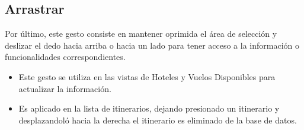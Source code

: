 \subsection{Arrastrar}
Por último, este gesto consiste en mantener oprimida el área de selección y deslizar el dedo hacia arriba o hacia un lado para tener 
acceso a la información o funcionalidades correspondientes. 
\begin{itemize}
 \item Este gesto se utiliza en las vistas de Hoteles y Vuelos Disponibles para actualizar la información.
 \item Es aplicado en la lista de itinerarios, dejando presionado un itinerario y desplazandoló hacia la derecha el itinerario es 
 eliminado de la base de datos.
\end{itemize}
